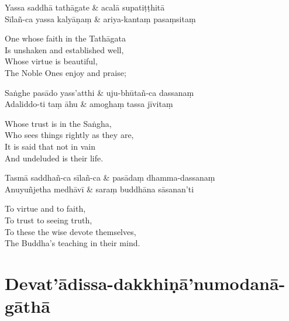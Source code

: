 

\begin{twochants}
Yassa saddhā tathāgate & acalā supatiṭṭhitā\\
Sīlañ-ca yassa kalyāṇaṃ & ariya-kantaṃ pasaṃsitaṃ\\
\end{twochants}

\begin{english}
  One whose faith in the Tathāgata\\
  Is unshaken and established well,\\
  Whose virtue is beautiful,\\
  The Noble Ones enjoy and praise;
\end{english}

\begin{twochants}
Saṅghe pasādo yass'atthi & uju-bhūtañ-ca dassanaṃ\\
Adaliddo-ti taṃ āhu & amoghaṃ tassa jīvitaṃ\\
\end{twochants}

\begin{english}
  Whose trust is in the Saṅgha,\\
  Who sees things rightly as they are,\\
  It is said that not in vain\\
  And undeluded is their life.
\end{english}

\begin{twochants}
Tasmā saddhañ-ca sīlañ-ca & pasādaṃ dhamma-dassanaṃ\\
Anuyuñjetha medhāvī & saraṃ buddhāna sāsanan'ti
\end{twochants}

\begin{english}
  To virtue and to faith,\\
  To trust to seeing truth,\\
  To these the wise devote themselves,\\
  The Buddha's teaching in their mind.
\end{english}


\section{Devat'ādissa-dakkhiṇā'numodanā-gāthā}

